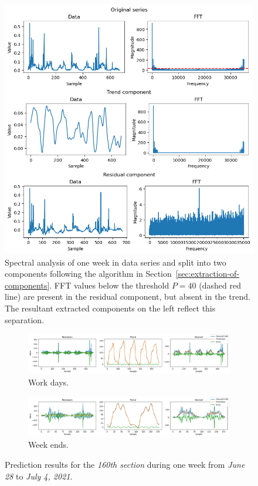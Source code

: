 \begin{figure}
	\includegraphics[width=\textwidth,keepaspectratio]{img/preprocessed.png}
	\centering
	\caption{Spectral analysis of one week in data series and split into two
	components following the algorithm in
	Section~\ref{sec:extraction-of-components}. FFT values below the threshold
	$P=40$ (dashed red line) are present in the residual component, but
	absent in the trend. The resultant extracted components on the left reflect
	this separation.}
	\label{fig:preprocessed}
\end{figure}

\begin{figure}
	\begin{subfigure}{\textwidth}
		\includegraphics[width=\textwidth,keepaspectratio]{img/prediction_wd.png}
		\caption{Work days.}
	\end{subfigure}
	\begin{subfigure}{\textwidth}
		\includegraphics[width=\textwidth,keepaspectratio]{img/prediction_we.png}
		\caption{Week ends.}
	\end{subfigure}
	\centering
	\caption{Prediction results for the \textit{160th section} during one week
	from \textit{June 28} to \textit{July 4, 2021}.}
	\label{fig:prediction}
\end{figure}

